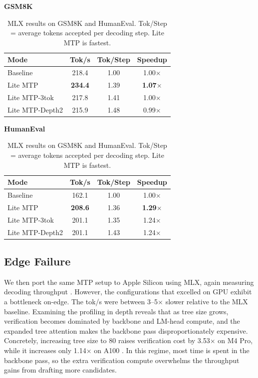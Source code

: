 \documentclass{article} %
\begin{document}
\begin{table}[t]
\caption{MLX results on GSM8K and HumanEval. Tok/Step = average tokens accepted per decoding step. Lite MTP is fastest.}
\label{tab:mlx_results}
\centering
\begin{minipage}{0.48\textwidth}
\centering
\small
\textbf{GSM8K}

\begin{tabular}{lccc}
\toprule
\textbf{Mode} & \textbf{Tok/s} & \textbf{Tok/Step} & \textbf{Speedup} \\
\midrule
Baseline & 218.4 & 1.00 & 1.00$\times$ \\
Lite MTP & \textbf{234.4} & 1.39 & \textbf{1.07$\times$} \\
Lite MTP-3tok & 217.8 & 1.41 & 1.00$\times$ \\
Lite MTP-Depth2 & 215.9 & 1.48 & 0.99$\times$ \\
\bottomrule
\end{tabular}
\label{tab:mlx_gsm8k}
\end{minipage}
\hfill
\begin{minipage}{0.48\textwidth}
\centering
\small
\textbf{HumanEval}

\begin{tabular}{lccc}
\toprule
\textbf{Mode} & \textbf{Tok/s} & \textbf{Tok/Step} & \textbf{Speedup} \\
\midrule
Baseline & 162.1 & 1.00 & 1.00$\times$ \\
Lite MTP & \textbf{208.6} & 1.36 & \textbf{1.29$\times$} \\
Lite MTP-3tok & 201.1 & 1.35 & 1.24$\times$ \\
Lite MTP-Depth2 & 201.1 & 1.43 & 1.24$\times$ \\
\bottomrule
\end{tabular}
\label{tab:mlx_humaneval}
\end{minipage}
\end{table}

\subsection{Edge Failure}

We then port the same MTP setup to Apple Silicon using MLX, again measuring decoding throughput \citep{hannun2023mlx}. However, the configurations that excelled on GPU exhibit a  bottleneck on-edge. The tok/s were between 3--5$\times$ slower relative to the MLX baseline. Examining the profiling in depth reveals that as tree size grows, verification becomes dominated by backbone and LM-head compute, and the expanded tree attention makes the backbone pass disproportionately expensive. Concretely, increasing tree size to 80 raises verification cost by 3.53$\times$ on M4 Pro, while it increases only 1.14$\times$ on A100 \citep{apple2024m4, nvidia2020a100}. In this regime, most time is spent in the backbone pass, so the extra verification compute overwhelms the throughput gains from drafting more candidates.
\end{document}
